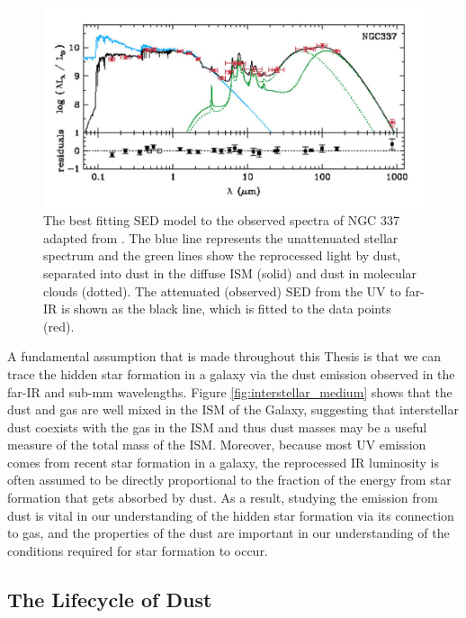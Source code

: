 \begin{figure}
    \centering
	\includegraphics[width=0.9\columnwidth]{Figures/unattenuated_attenuated_sed.pdf}
	\caption[SED of NGC 337]{The best fitting SED model to the observed spectra of NGC 337 adapted from \citealt{daCunha_2008}. The blue line represents the unattenuated stellar spectrum and the green lines show the reprocessed light by dust, separated into dust in the diffuse ISM (solid) and dust in molecular clouds (dotted). The attenuated (observed) SED from the UV to far-IR is shown as the black line, which is fitted to the data points (red).}
	\label{fig:unattenuated_attenuated_sed}
\end{figure}

A fundamental assumption that is made throughout this Thesis is that we can trace the hidden star formation in a galaxy via the dust emission observed in the far-IR and sub-mm wavelengths. Figure \ref{fig:interstellar_medium} shows that the dust and gas are well mixed in the ISM of the Galaxy, suggesting that interstellar dust coexists with the gas in the ISM and thus dust masses may be a useful measure of the total mass of the ISM. Moreover, because most UV emission comes from recent star formation in a galaxy, the reprocessed IR luminosity is often assumed to be directly proportional to the fraction of the energy from star formation that gets absorbed by dust. As a result, studying the emission from dust is vital in our understanding of the hidden star formation via its connection to gas, and the properties of the dust are important in our understanding of the conditions required for star formation to occur.

\subsection{The Lifecycle of Dust}

